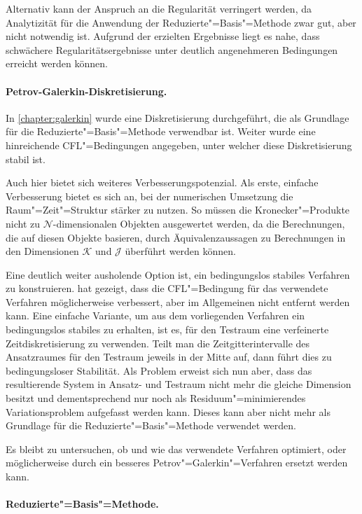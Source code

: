 \documentclass[../main.tex]{subfiles}
\begin{document}
Alternativ kann der Anspruch an die Regularität verringert werden, da Analytizität für die Anwendung der Reduzierte"=Basis"=Methode zwar gut, aber nicht notwendig ist.
Aufgrund der erzielten Ergebnisse liegt es nahe, dass schwächere Regularitätsergebnisse unter deutlich angenehmeren Bedingungen erreicht werden können.

\paragraph{Petrov-Galerkin-Diskretisierung.} %
\label{par:petrov_galerkin_diskretisierung}

In \cref{chapter:galerkin} wurde eine Diskretisierung durchgeführt, die als Grundlage für die Reduzierte"=Basis"=Methode verwendbar ist.
Weiter wurde eine hinreichende CFL"=Bedingungen angegeben, unter welcher diese Diskretisierung stabil ist.

Auch hier bietet sich weiteres Verbesserungspotenzial.
Als erste, einfache Verbesserung bietet es sich an, bei der numerischen Umsetzung die Raum"=Zeit"=Struktur stärker zu nutzen.
So müssen die Kronecker"=Produkte nicht zu $\mathcal N$-dimensionalen Objekten ausgewertet werden, da die Berechnungen, die auf diesen Objekte basieren, durch Äquivalenzaussagen zu Berechnungen in den Dimensionen $\mathcal K$ und $\mathcal J$ überführt werden können.

Eine deutlich weiter ausholende Option ist, ein bedingungslos stabiles Verfahren zu konstruieren.
\textcite[Section 5.2]{Andreev:2012ep} hat gezeigt, dass die CFL"=Bedingung für das verwendete Verfahren möglicherweise verbessert, aber im Allgemeinen nicht entfernt werden kann.
Eine einfache Variante, um aus dem vorliegenden Verfahren ein bedingungslos stabiles zu erhalten, ist es, für den Testraum eine verfeinerte Zeitdiskretisierung zu verwenden.
Teilt man die Zeitgitterintervalle des Ansatzraumes für den Testraum jeweils in der Mitte auf, dann führt dies zu bedingungsloser Stabilität.
Als Problem erweist sich nun aber, dass das resultierende System in Ansatz- und Testraum nicht mehr die gleiche Dimension besitzt und dementsprechend nur noch als Residuum"=minimierendes Variationsproblem aufgefasst werden kann.
Dieses kann aber nicht mehr als Grundlage für die Reduzierte"=Basis"=Methode verwendet werden.

Es bleibt zu untersuchen, ob und wie das verwendete Verfahren optimiert, oder möglicherweise durch ein besseres Petrov"=Galerkin"=Verfahren ersetzt werden kann.

\paragraph{Reduzierte"=Basis"=Methode.} %
\label{par:reduzierte_basis_methode}
\end{document}
